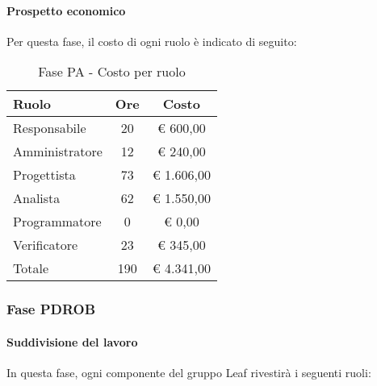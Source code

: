 \documentclass[../PianoProgetto.tex]{subfiles}
\begin{document}
	\paragraph{Prospetto economico}
					Per questa fase, il costo di ogni ruolo è indicato di seguito:
					\begin{table}[h]
		\centering
	
		\begin{tabular}{l * {2}{c}}
			\toprule
			Ruolo & Ore & Costo \\
			\midrule
			Responsabile &	20 & \euro{} 600,00 \\
			\midrule
			Amministratore & 12 & \euro{} 240,00 \\
			\midrule
			Progettista & 73 & \euro{} 1.606,00 \\
			\midrule
			Analista & 62 & \euro{} 1.550,00 \\
			\midrule
			Programmatore & 0 & \euro{} 0,00 \\
			\midrule
			Verificatore & 23 & \euro{} 345,00 \\
			\midrule		
			Totale & 190 & \euro{} 4.341,00 \\
			\bottomrule
			
		\end{tabular}
		
		\caption{Fase PA - Costo per ruolo}
		\label{tab:fasePA_costo}
		
	\end{table}
	
	\subsubsection{Fase PDROB}
				\paragraph{Suddivisione del lavoro}
					In questa fase, ogni componente del gruppo Leaf rivestirà i seguenti ruoli:
	
\end{document}
